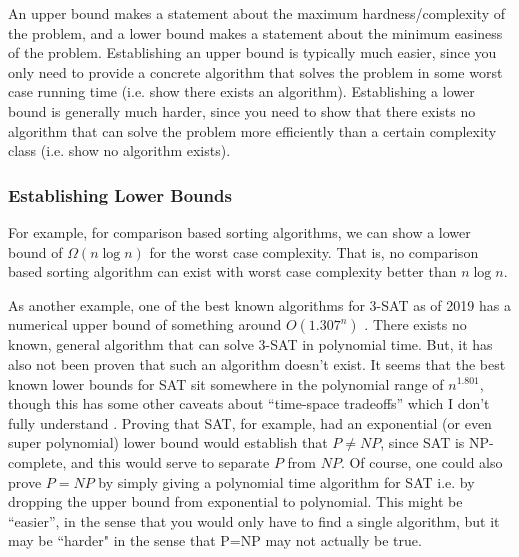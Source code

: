 \documentclass[10pt,a4paper]{article}
\begin{document}
An upper bound makes a statement about the maximum hardness/complexity of the problem, and a lower bound makes a statement about the minimum easiness of the problem. Establishing an upper bound is typically much easier, since you only need to provide a concrete algorithm that solves the problem in some worst case running time (i.e. show there exists an algorithm). Establishing a lower bound is generally much harder, since you need to show that there exists no algorithm that can solve the problem more efficiently than a certain complexity class (i.e. show no algorithm exists). 

\subsubsection*{Establishing Lower Bounds}

For example, for comparison based sorting algorithms, we can show a lower bound of $\Omega(n \log{n})$ for the worst case complexity. That is, no comparison based sorting algorithm can exist with worst case complexity better than $n \log{n}$. 

As another example, one of the best known algorithms for 3-SAT as of 2019 has a numerical upper bound of something around $O(1.307^n)$ \cite{2019fasterkSAT}. There exists no known, general algorithm that can solve 3-SAT in polynomial time. But, it has also not been proven that such an algorithm doesn't exist. It seems that the best known lower bounds for SAT sit somewhere in the polynomial range of $n^{1.801}$, though this has some other caveats about ``time-space tradeoffs'' which I don't fully understand \cite{SE3satlowerbounds}. Proving that SAT, for example, had an exponential (or even super polynomial) lower bound would establish that $P \neq NP$, since SAT is NP-complete, and this would serve to separate $P$ from $NP$. Of course, one could also prove $P=NP$ by simply giving a polynomial time algorithm for SAT i.e. by dropping the upper bound from exponential to polynomial. This might be ``easier'', in the sense that you would only have to find a single algorithm, but it may be ``harder" in the sense that P=NP may not actually be true.



\end{document}
